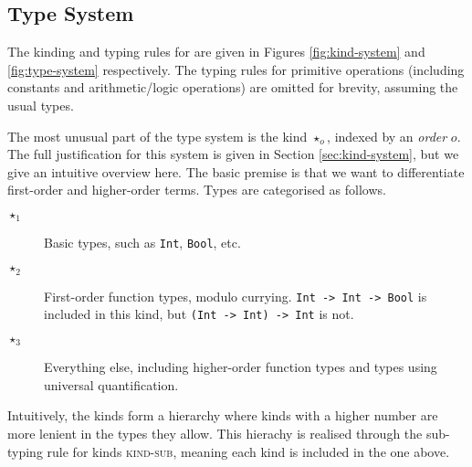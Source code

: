 \documentclass[runningheads]{llncs}
\begin{document}
\subsection{Type System}

The kinding and typing rules for \core{} are given in Figures \ref{fig:kind-system} and \ref{fig:type-system} respectively. The typing rules for primitive operations (including constants and arithmetic/logic operations) are omitted for brevity, assuming the usual types.



The most unusual part of the type system is the kind $\star_o$, indexed by an \textit{order} $o$. The full justification for this system is given in Section \ref{sec:kind-system}, but we give an intuitive overview here. The basic premise is that we want to differentiate first-order and higher-order terms. Types are categorised as follows.

\begin{description}
   \item[$\star_1$] Basic types, such as \texttt{Int}, \texttt{Bool}, etc.
   \item[$\star_2$] First-order function types, modulo currying. \texttt{Int -> Int -> Bool} is included in this kind, but \texttt{(Int -> Int) -> Int} is not.
   \item[$\star_3$] Everything else, including higher-order function types and types using universal quantification.
\end{description}

Intuitively, the kinds form a hierarchy where kinds with a higher number are more lenient in the types they allow. This hierachy is realised through the sub-typing rule for kinds \textsc{kind-sub}, meaning each kind is included in the one above.
\end{document}
